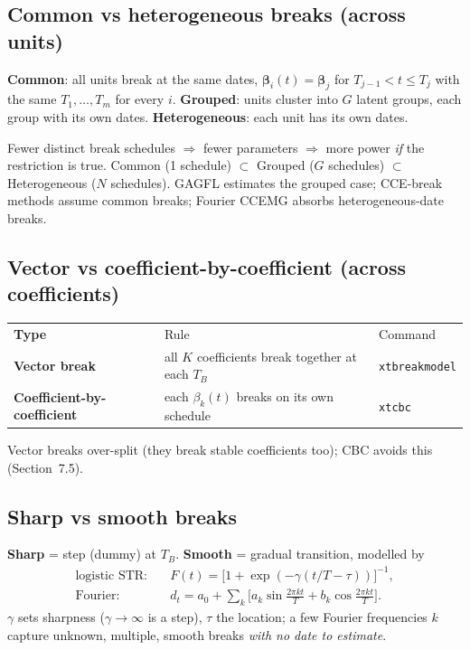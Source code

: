 \documentclass[11pt,a4paper]{article}
\newcommand{\cmd}[1]{\texttt{\textcolor{camber}{#1}}}
\newcommand{\hlt}[2]{\textcolor{#1}{\textbf{#2}}}
\newcommand{\bbeta}{\boldsymbol{\beta}}
\theoremstyle{definition}
\begin{document}
\subsection{Common vs heterogeneous breaks (across units)}
\begin{definition}
\hlt{cblue}{Common}: all units break at the same dates,
$\bbeta_i(t)=\bbeta_j$ for $T_{j-1}<t\le T_j$ with the same $T_1,\dots,T_m$ for every $i$.
\hlt{cteal}{Grouped}: units cluster into $G$ latent groups, each group with its own dates.
\hlt{camber}{Heterogeneous}: each unit has its own dates.
\end{definition}
\begin{keyidea}
Fewer distinct break schedules $\Rightarrow$ fewer parameters $\Rightarrow$ more power \emph{if} the
restriction is true. Common (1 schedule) $\subset$ Grouped ($G$ schedules) $\subset$ Heterogeneous
($N$ schedules). GAGFL estimates the grouped case; CCE-break methods assume common breaks; Fourier
CCEMG absorbs heterogeneous-date breaks.
\end{keyidea}

\subsection{Vector vs coefficient-by-coefficient (across coefficients)}
\begin{center}
\begin{tabular}{@{}>{\bfseries}l p{8.6cm} l@{}}
\rowcolor{cgrape}\color{white}Type & \color{white}Rule & \color{white}Command\\
Vector break & all $K$ coefficients break together at each $T_B$ & \cmd{xtbreakmodel}\\
Coefficient-by-coefficient & each $\beta_k(t)$ breaks on its own schedule & \cmd{xtcbc}\\
\end{tabular}
\end{center}
Vector breaks over-split (they break stable coefficients too); CBC avoids this (Section~7.5).

\subsection{Sharp vs smooth breaks}
\begin{definition}
\hlt{cred}{Sharp} = step (dummy) at $T_B$. \hlt{cgrape}{Smooth} = gradual transition, modelled by
\begin{align}
\text{logistic STR:}\quad & F(t)=\big[1+\exp(-\gamma(t/T-\tau))\big]^{-1},\\
\text{Fourier:}\quad & d_t=a_0+\textstyle\sum_k\big[a_k\sin\tfrac{2\pi k t}{T}+b_k\cos\tfrac{2\pi k t}{T}\big].
\end{align}
$\gamma$ sets sharpness ($\gamma\to\infty$ is a step), $\tau$ the location; a few Fourier frequencies
$k$ capture unknown, multiple, smooth breaks \emph{with no date to estimate}.
\end{definition}
\end{document}
